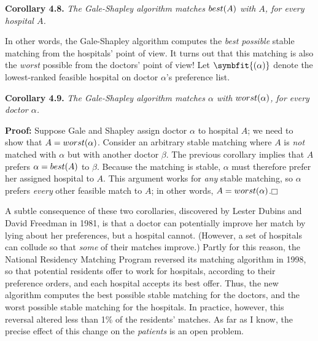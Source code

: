 \noindent\textbf{Corollary 4.8.} \textsl{The Gale-Shapley algorithm matches $best(A)$ with $A$, for every hospital $A$.}

In other words, the Gale-Shapley algorithm computes the \textit{best possible} stable matching from the hospitals’ point of view.
It turns out that this matching is also the \textit{worst} possible from the doctors’ point of view!
Let \textbf{}$\symbfit{(\alpha)}$ denote the lowest-ranked feasible hospital on doctor $\alpha$’s preference list.

\noindent\textbf{Corollary 4.9.} \textsl{The Gale-Shapley algorithm matches $\alpha$ with $worst(\alpha)$, for every doctor $\alpha$.}

\noindent\textbf{Proof:} Suppose Gale and Shapley assign doctor $\alpha$ to hospital $A$; we need to show that $A = worst(\alpha)$.
Consider an arbitrary stable matching where $A$ is \textit{not} matched with $\alpha$ but with another doctor $\beta$.
The previous corollary implies that $A$ prefers $\alpha = best(A)$ to $\beta$.
Because the matching is stable, $\alpha$ must therefore prefer her assigned hospital to $A$.
This argument works for \textit{any} stable matching, so $\alpha$ prefers \textit{every} other feasible match to $A$; in other words, $A = worst(\alpha)$.\hfill$\mdlgwhtsquare$

A subtle consequence of these two corollaries, discovered by Lester Dubins and David Freedman in 1981, is that a doctor can potentially improve her match by lying about her preferences, but a hospital cannot.
(However, a set of hospitals can collude so that \textit{some} of their matches improve.)
Partly for this reason, the National Residency Matching Program reversed its matching algorithm in 1998, so that potential residents offer to work for hospitals, according to their preference orders, and each hospital accepts its best offer.
Thus, the new algorithm computes the best possible stable matching for the doctors, and the worst possible stable matching for the hospitals.
In practice, however, this reversal altered less than 1\% of the residents’ matches.
As far as I know, the precise effect of this change on the \textit{patients} is an open problem.

